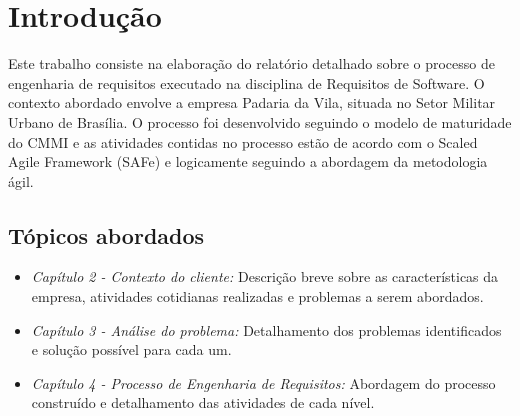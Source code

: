\chapter{Introdução}

Este trabalho consiste na elaboração do relatório detalhado sobre o processo de engenharia de requisitos executado na disciplina de Requisitos de Software. O contexto abordado envolve a empresa Padaria da Vila, situada no Setor Militar Urbano de Brasília. O processo foi desenvolvido seguindo o modelo de maturidade do CMMI e as atividades contidas no processo estão de acordo com o Scaled Agile Framework (SAFe) e logicamente seguindo a abordagem da metodologia ágil.

\section{Tópicos abordados}

\begin{itemize}
	\item \textit{Capítulo 2 - Contexto do cliente:} Descrição breve sobre as características da empresa, atividades cotidianas realizadas e problemas a serem abordados. 
	\item \textit{Capítulo 3 - Análise do problema:} Detalhamento dos problemas identificados e solução possível para cada um.

	\item \textit{Capítulo 4 - Processo de Engenharia de Requisitos:} Abordagem do processo construído e detalhamento das atividades de cada nível.
\end{itemize}
